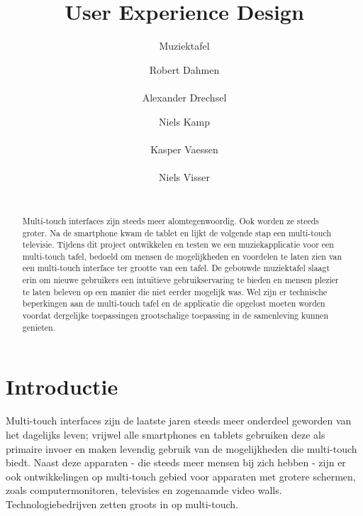 \documentclass{acm}
\begin{document}
\title{User Experience Design}
\subtitle{Muziektafel}

\author{
\alignauthor Robert Dahmen\\
       \\
\alignauthor Alexander Drechsel
       \\
\and
\alignauthor Niels Kamp\\
       \\
\alignauthor Kasper Vaessen\\
       \\
\alignauthor Niels Visser\\
       \\
}
\maketitle

\begin{abstract}
Multi-touch interfaces zijn steeds meer alomtegenwoordig. Ook worden ze steeds groter. Na de smartphone kwam de tablet en lijkt de volgende stap een multi-touch televisie. Tijdens dit project ontwikkelen en testen we een muziekapplicatie voor een multi-touch tafel, bedoeld om mensen de mogelijkheden en voordelen te laten zien van een multi-touch interface ter grootte van een tafel. De gebouwde muziektafel slaagt erin om nieuwe gebruikers een intu\"itieve gebruikservaring te bieden en mensen plezier te laten beleven op een manier die niet eerder mogelijk was. Wel zijn er technische beperkingen aan de multi-touch tafel en de applicatie die opgelost moeten worden voordat dergelijke toepassingen grootschalige toepassing in de samenleving kunnen genieten.
\end{abstract}


\section{Introductie}
Multi-touch interfaces zijn de laatste jaren steeds meer onderdeel geworden van het dagelijks leven; vrijwel alle smartphones en tablets gebruiken deze als primaire invoer en maken levendig gebruik van de mogelijkheden die multi-touch biedt. Naast deze apparaten - die steeds meer mensen bij zich hebben - zijn er ook ontwikkelingen op multi-touch gebied voor apparaten met grotere schermen, zoals computermonitoren, televisies en zogenaamde video walls. Technologiebedrijven zetten groots in op multi-touch.
\end{document}
